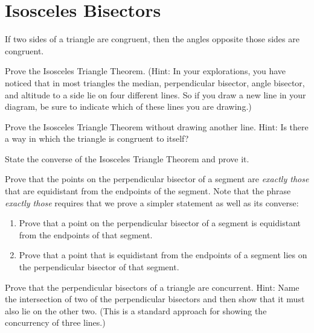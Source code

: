 \newpage

\section{Isosceles Bisectors}

\begin{theorem}
If two sides of a triangle are congruent, then the angles opposite those sides are congruent. 
\end{theorem}

\begin{prob}
Prove the Isosceles Triangle Theorem.  (Hint: In your explorations, you have noticed that in most triangles the median, perpendicular bisector, angle bisector, and altitude to a side lie on four different lines.  So if you draw a new line in your diagram, be sure to indicate which of these lines you are drawing.)
\end{prob}

\begin{prob}
Prove the Isosceles Triangle Theorem without drawing another line.  Hint:  Is there a way in which the triangle is congruent to itself? 
\end{prob}

\begin{prob}
State the converse of the Isosceles Triangle Theorem and prove it.  
\end{prob}

\begin{prob}
Prove that the points on the perpendicular bisector of a segment are \emph{exactly those} that are equidistant from the endpoints of the segment.  Note that the phrase \emph{exactly those} requires that we prove a simpler statement as well as its converse:   
\begin{enumerate}
\item Prove that a point on the perpendicular bisector of a segment is equidistant from the endpoints of that segment.
\item Prove that a point that is equidistant from the endpoints of a segment lies on the perpendicular bisector of that segment.
\end{enumerate}
\end{prob}

\begin{prob}
Prove that the perpendicular bisectors of a triangle are concurrent.  Hint:  Name the intersection of two of the perpendicular bisectors and then show that it must also lie on the other two.  (This is a standard approach for showing the concurrency of three lines.)  
\end{prob}

